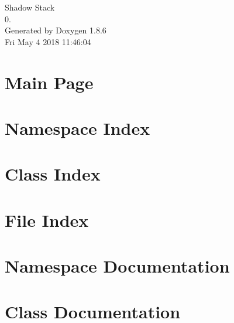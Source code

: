 \documentclass[twoside]{book}
\newcommand{\clearemptydoublepage}{%
  \newpage{\pagestyle{empty}\cleardoublepage}%
}
\begin{document}
\hypersetup{pageanchor=false}
\begin{titlepage}
\vspace*{7cm}
\begin{center}%
{\Large Shadow Stack \\[1ex]\large 0. }\\
\vspace*{1cm}
{\large Generated by Doxygen 1.8.6}\\
\vspace*{0.5cm}
{\small Fri May 4 2018 11:46:04}\\
\end{center}
\end{titlepage}
\clearemptydoublepage
\tableofcontents
\clearemptydoublepage
{}
\hypersetup{pageanchor=true}

\chapter{Main Page}
\label{index}\hypertarget{index}{}
\chapter{Namespace Index}

\chapter{Class Index}

\chapter{File Index}

\chapter{Namespace Documentation}



\chapter{Class Documentation}




















\end{document}
